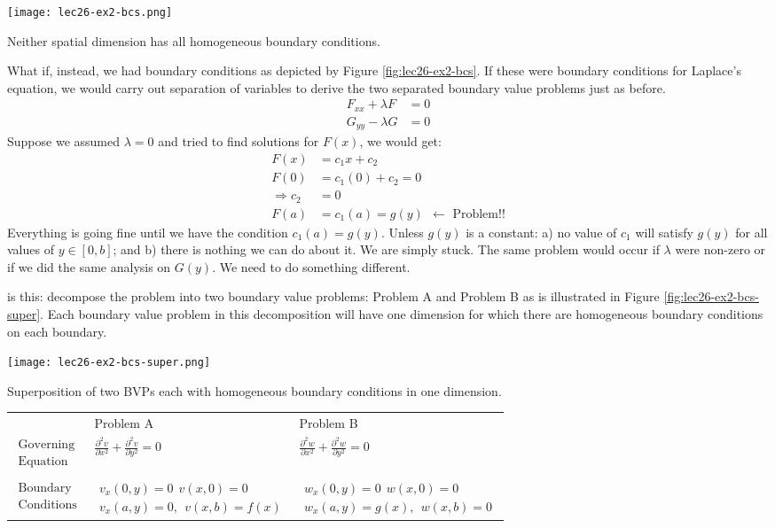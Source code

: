 \begin{marginfigure}
\texttt{[image: lec26-ex2-bcs.png]}
\caption{Neither spatial dimension has all homogeneous boundary conditions.}
\label{fig:lec26-ex2-bcs}
\end{marginfigure}
What if, instead, we had boundary conditions as depicted by Figure \ref{fig:lec26-ex2-bcs}.  If these were boundary conditions for Laplace's equation, we would carry out separation of variables to derive the two separated boundary value problems just as before.
\begin{align*}
F_{xx}+\lambda F &= 0 \\
G_{yy}-\lambda G &= 0
\end{align*}
Suppose we assumed $\lambda = 0$ and tried to find solutions for $F(x)$, we would get:
\begin{align*}
F(x) &= c_1 x + c_2 \\
F(0) &= c_1 (0) +  c_2 = 0 \\
\Rightarrow c_2 &= 0 \\
F(a) &= c_1(a) = g(y) \ \ \leftarrow \text{  Problem!!}
\end{align*}
Everything is going fine until we have the condition $c_1(a) = g(y)$.  Unless $g(y)$ is a constant: a) no value of $c_1$ will satisfy $g(y)$ for all values of $y \in [0,b]$; and b) there is nothing we can do about it.  We are simply stuck.  The same problem would occur if $\lambda$ were non-zero or if we did the same analysis on $G(y)$.  We need to do something different.


 is this: decompose the problem into two boundary value problems: Problem A and Problem B as is illustrated in Figure \ref{fig:lec26-ex2-bcs-super}.  Each boundary value problem in this decomposition will have one dimension for which there are homogeneous boundary conditions on each boundary.
\begin{marginfigure}
\texttt{[image: lec26-ex2-bcs-super.png]}
\caption{Superposition of two BVPs each with homogeneous boundary conditions in one dimension.}
\label{fig:lec26-ex2-bcs-super}
\end{marginfigure}
\begin{table}
\begin{tabular}{l l | l}
 & Problem A & Problem B \\ 
 $\substack{\text{Governing} \\ \text{Equation}}$ & $\frac{\partial^2 v}{\partial x^2} + \frac{\partial^2 v}{\partial y^2}=0$ & $\frac{\partial^2 w}{\partial x^2} + \frac{\partial^2 w}{\partial y^2}=0$\\
 & & \\
 $\substack{\text{Boundary}\\\text{Conditions}}$ & $\substack{v_x(0,y) = 0 \ \ v(x,0) = 0\\ v_x(a,y) = 0, \ \ v(x,b)=f(x)}$ & $\substack{w_x(0,y) = 0 \ \ w(x,0) = 0 \\ w_x(a,y) = g(x), \ \ w(x,b) = 0}$
\end{tabular}
\end{table}


